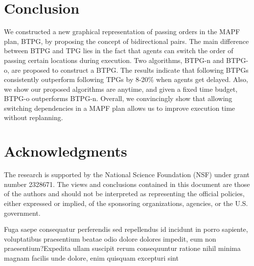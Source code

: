 \documentclass[letterpaper]{article} %
\theoremstyle{definition}
\begin{document}
\section{Conclusion}
We constructed a new graphical representation of passing orders in the MAPF plan, BTPG, by proposing the concept of bidirectional pairs. The main difference between BTPG and TPG lies in the fact that agents can switch the order of passing certain locations during execution. Two algorithms, BTPG-n and BTPG-o, are proposed to construct a BTPG. The results indicate that following BTPGs consistently outperform following TPGs by 8-20\% when agents get delayed. Also, we show our proposed algorithms are anytime, and given a fixed time budget, BTPG-o outperforms BTPG-n. Overall, we convincingly show that allowing switching dependencies in a MAPF plan allows us to improve execution time without replanning.


\section*{Acknowledgments}
The research is supported by the National Science Foundation (NSF) under grant number 2328671. The views and conclusions contained in this document are those of the authors and should not be interpreted as representing the official policies, either expressed or implied, of the sponsoring organizations, agencies, or the U.S. government.


Fuga saepe consequatur perferendis sed repellendus id incidunt in porro sapiente, voluptatibus praesentium beatae odio dolore dolores impedit, eum non praesentium?Expedita ullam suscipit rerum consequuntur ratione nihil minima magnam facilis unde dolore, enim quisquam excepturi sint

\end{document}
